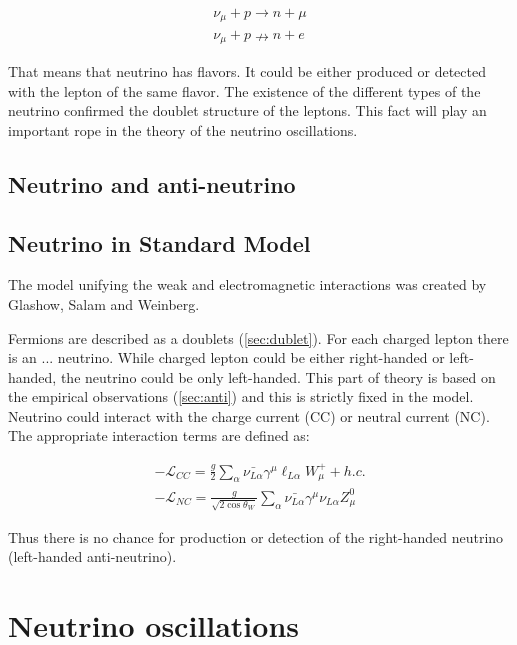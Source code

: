 \documentclass[../main.tex]{subfiles}
\begin{document}
\begin{eqnarray}
\label{eq:allowed}
\nu_\mu+p\rightarrow n+\mu \\
\nu_\mu+p\nrightarrow n+e
\label{eq:notallowed}
\end{eqnarray}

That means that neutrino has flavors. It could be either produced or detected with the lepton of the same flavor. The existence of the different types of the neutrino confirmed the doublet structure of the leptons. This fact will play an important rope in the theory of the neutrino oscillations.

\subsection{Neutrino and anti-neutrino}
\label{sec:anti}

\subsection{Neutrino in Standard Model}
\label{sec:sm}

The model unifying the weak and electromagnetic interactions was created by Glashow, Salam and Weinberg.

Fermions are described as a doublets (\autoref{sec:dublet}). For each charged lepton there is an ... neutrino. While charged lepton could be either right-handed or left-handed, the neutrino could be only left-handed. This part of theory is based on the empirical observations (\autoref{sec:anti}) and this is strictly fixed in the model. Neutrino could interact with the charge current (CC) or neutral current (NC). The appropriate interaction terms are defined as:

\begin{eqnarray}
-\mathcal{L}_{CC}=\frac{g}{2}\sum_\alpha\bar{\nu_{L\alpha}}\gamma^\mu\ell_{L\alpha}W^+_\mu+h.c. \\ \nonumber
-\mathcal{L}_{NC}=\frac{g}{\sqrt{2\cos{\theta_W}}}\sum_\alpha\bar{\nu_{L\alpha}}\gamma^\mu\nu_{L\alpha}Z^0_\mu
\end{eqnarray}

Thus there is no chance for production or detection of the right-handed neutrino (left-handed anti-neutrino).




\section{Neutrino oscillations}
\label{sec:osc}
\end{document}
